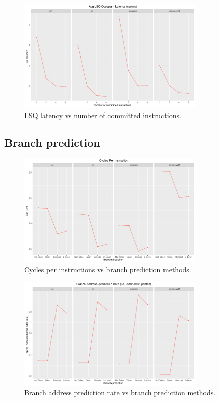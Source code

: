 \documentclass[10pt]{scrartcl}
\begin{document}
\begin{figure}[h]
  \centering
  \includegraphics[width=0.8\textwidth]{Plots/plot_C_lsq_latency}
  \caption{LSQ latency vs number of committed instructions.}\label{fig:c_lsq_latency}
\end{figure}

\FloatBarrier

\subsection{Branch prediction}

\begin{figure}[h]
  \centering
  \includegraphics[width=0.8\textwidth]{Plots/plot_BP_sim_CPI}
  \caption{Cycles per instructions vs branch prediction methods.}\label{fig:bp_sim_cpi}
\end{figure}

\begin{figure}[h]
  \centering
  \includegraphics[width=0.8\textwidth]{Plots/plot_BP_bpred_addr_rate}
  \caption{Branch address prediction rate vs branch prediction methods.}\label{fig:bp_addr-pred-rate}
\end{figure}
\end{document}
